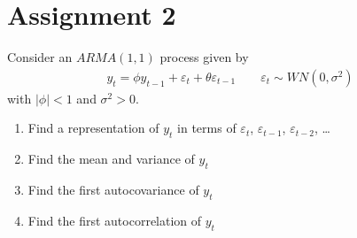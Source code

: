 \documentclass[12pt]{article}
\begin{document}

\section*{Assignment 2}

Consider an $ ARMA(1, 1) $ process given by
\begin{align*}
    y_{t} = \phi y_{t-1} + \varepsilon_{t} + \theta \varepsilon_{t-1} \qquad \varepsilon_{t} \sim WN(0, \sigma^2)
\end{align*}
with $ | \phi | < 1 $ and $ \sigma^2 > 0 $.

\begin{enumerate}
    \item Find a representation of $ y_{t} $ in terms of $ \varepsilon_{t} $, $ \varepsilon_{t-1} $, $ \varepsilon_{t-2} $, \ldots
    \item Find the mean and variance of $ y_{t} $
    \item Find the first autocovariance of $ y_{t} $
    \item Find the first autocorrelation of $ y_{t} $
\end{enumerate}

\end{document}
